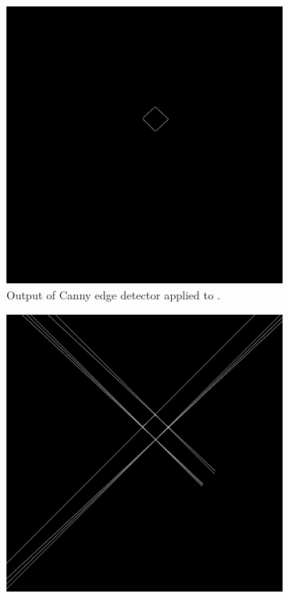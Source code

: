 \begin{figure}[H]
\begin{subfigure}[b]{0.4\textwidth}
        \includegraphics[width=\textwidth]{figures/202105/blue-cube-top-canny.jpg}
        \caption{Output of Canny edge detector applied to .}
        \label{fig:blue-cube-top-canny}
    \end{subfigure}
    \begin{subfigure}[b]{0.4\textwidth}
        \includegraphics[width=\textwidth]{figures/202105/blue-cube-top-hough.jpg}

\end{subfigure}
\end{figure}
